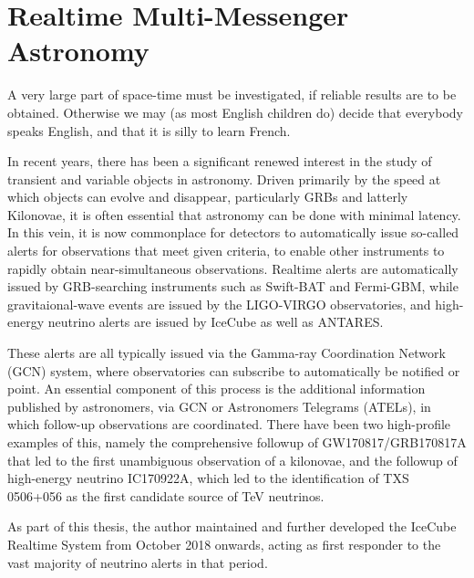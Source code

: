 \setchapterpreamble[u]{\margintoc}
\chapter{Realtime Multi-Messenger Astronomy}
\begin{fquote}A very large part of space-time must be investigated, if reliable results are to be obtained. Otherwise we may (as most English children do) decide that everybody speaks English, and that it is silly to learn French.
\end{fquote}

In recent years, there has been a significant renewed interest in the study of transient and variable objects in astronomy. Driven primarily by the speed at which objects can evolve and disappear, particularly GRBs and latterly Kilonovae, it is often essential that astronomy can be done with minimal latency. In this vein, it is now commonplace for detectors to automatically issue so-called alerts for observations that meet given criteria, to enable other instruments to rapidly obtain near-simultaneous observations. Realtime alerts are automatically issued by GRB-searching instruments such as Swift-BAT and Fermi-GBM, while gravitaional-wave events are issued by the LIGO-VIRGO observatories, and high-energy neutrino alerts are issued by IceCube as well as ANTARES.

These alerts are all typically issued via  the Gamma-ray Coordination Network (GCN) system, where observatories can subscribe to automatically be notified or point.  An essential component of this process is the additional information published by astronomers, via GCN or Astronomers Telegrams (ATELs), in which follow-up observations are coordinated. There have been two high-profile examples of this, namely the comprehensive followup of GW170817/GRB170817A that led to the first unambiguous observation of a kilonovae, and the followup of high-energy neutrino IC170922A, which led to the identification of TXS 0506+056 as the first candidate source of TeV neutrinos. 

As part of this thesis, the author maintained and further developed the IceCube Realtime System from October 2018 onwards, acting as first responder to the vast majority of neutrino alerts in that period.

